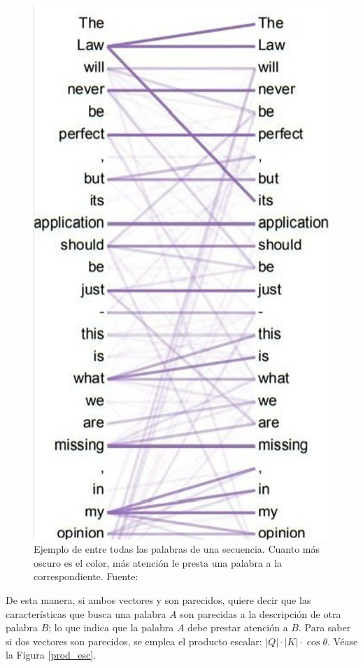 \begin{figure}[H]
    \centering
    \includegraphics[scale = 0.35]{imgs/sequence_attention.png}
    \caption{Ejemplo de  entre todas las palabras de una secuencia. Cuanto más oscuro es el color, más atención le presta una palabra a la correspondiente. \scriptsize{Fuente: \parencite{transformers}}}
    \label{att_seq}
\end{figure}
De esta manera, si ambos vectores  y  son parecidos, quiere decir que las características que busca una palabra $A$ son parecidas a la descripción de otra palabra $B$; lo que indica que la palabra $A$ debe prestar atención a $B$. Para saber si dos vectores son parecidos, se emplea el producto escalar: $|Q| \cdot |K| \cdot \cos{\theta}$. Véase la Figura \ref{prod_esc}.

